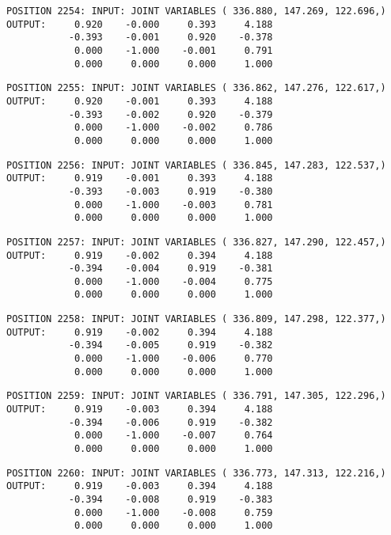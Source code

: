 \begin{verbatim}
POSITION 2254: INPUT: JOINT VARIABLES ( 336.880, 147.269, 122.696,)
OUTPUT:     0.920    -0.000     0.393     4.188
           -0.393    -0.001     0.920    -0.378
            0.000    -1.000    -0.001     0.791
            0.000     0.000     0.000     1.000
\end{verbatim} \pagebreak[1]\begin{verbatim}
POSITION 2255: INPUT: JOINT VARIABLES ( 336.862, 147.276, 122.617,)
OUTPUT:     0.920    -0.001     0.393     4.188
           -0.393    -0.002     0.920    -0.379
            0.000    -1.000    -0.002     0.786
            0.000     0.000     0.000     1.000
\end{verbatim} \pagebreak[1]\begin{verbatim}
POSITION 2256: INPUT: JOINT VARIABLES ( 336.845, 147.283, 122.537,)
OUTPUT:     0.919    -0.001     0.393     4.188
           -0.393    -0.003     0.919    -0.380
            0.000    -1.000    -0.003     0.781
            0.000     0.000     0.000     1.000
\end{verbatim} \pagebreak[1]\begin{verbatim}
POSITION 2257: INPUT: JOINT VARIABLES ( 336.827, 147.290, 122.457,)
OUTPUT:     0.919    -0.002     0.394     4.188
           -0.394    -0.004     0.919    -0.381
            0.000    -1.000    -0.004     0.775
            0.000     0.000     0.000     1.000
\end{verbatim} \pagebreak[1]\begin{verbatim}
POSITION 2258: INPUT: JOINT VARIABLES ( 336.809, 147.298, 122.377,)
OUTPUT:     0.919    -0.002     0.394     4.188
           -0.394    -0.005     0.919    -0.382
            0.000    -1.000    -0.006     0.770
            0.000     0.000     0.000     1.000
\end{verbatim} \pagebreak[1]\begin{verbatim}
POSITION 2259: INPUT: JOINT VARIABLES ( 336.791, 147.305, 122.296,)
OUTPUT:     0.919    -0.003     0.394     4.188
           -0.394    -0.006     0.919    -0.382
            0.000    -1.000    -0.007     0.764
            0.000     0.000     0.000     1.000
\end{verbatim} \pagebreak[1]\begin{verbatim}
POSITION 2260: INPUT: JOINT VARIABLES ( 336.773, 147.313, 122.216,)
OUTPUT:     0.919    -0.003     0.394     4.188
           -0.394    -0.008     0.919    -0.383
            0.000    -1.000    -0.008     0.759
            0.000     0.000     0.000     1.000
\end{verbatim} \pagebreak[1]\begin{verbatim}

\end{verbatim}
